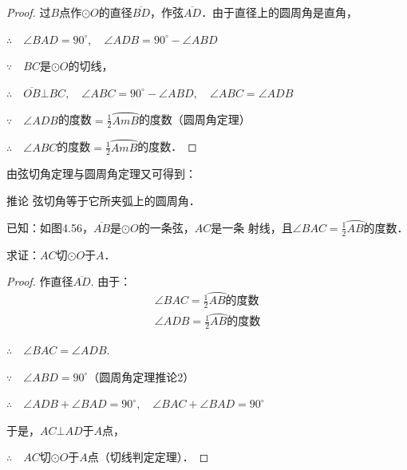   \begin{proof}
  过$B$点作$\odot O$的直径$\overline{BD}$，作弦$\overline{AD}$．由于直径上的圆周角是直角，
  
  $\therefore\quad \angle BAD=90^{\circ},\quad \angle ADB=90^{\circ}-\angle ABD$
  
  $\because\quad BC$是$\odot O$的切线，
  
  $\therefore\quad \overline{OB}\bot BC,\quad \angle ABC=90^{\circ}-\angle ABD,\quad \angle ABC=\angle ADB$
  
  $\because\quad \angle ADB$的度数$=\frac{1}{2}\wideparen{AmB}$的度数（圆周角定理）
  
  $\therefore\quad \angle ABC$的度数$=\frac{1}{2}\wideparen{AmB}$的度数．
  \end{proof}
  
    由弦切角定理与圆周角定理又可得到：
    
  \begin{blk}
    {推论} 弦切角等于它所夹弧上的圆周角．
  \end{blk}
  
  \begin{example}
    已知：如图4.56，$\overline{AB}$是$\odot O$的一条弦，$AC$是一条
    射线，且$\angle BAC=\frac{1}{2}\wideparen{AB}$的度数．
  
    求证：$AC$切$\odot O$于$A$．
  \end{example}
  
  \begin{proof}
  作直径$\overline{AD}$. 由于：
  \begin{align*}
    \angle BAC=\frac{1}{2}\wideparen{AB}\text{的度数}\tag{已知}\\
    \angle ADB=\frac{1}{2}\wideparen{AB}\text{的度数}\tag{圆周角定理}
  \end{align*}
  
  $\therefore\quad \angle BAC = \angle ADB$.
  
  $\because\quad \angle ABD=90^{\circ}$（圆周角定理推论2）
  
  $\therefore\quad \angle ADB+\angle BAD=90^{\circ},\quad \angle BAC+\angle BAD=90^{\circ}$
  
  于是，$AC\bot AD$于$A$点，
  
  $\therefore\quad AC$切$\odot O$于$A$点（切线判定定理）．  
  \end{proof}
  
